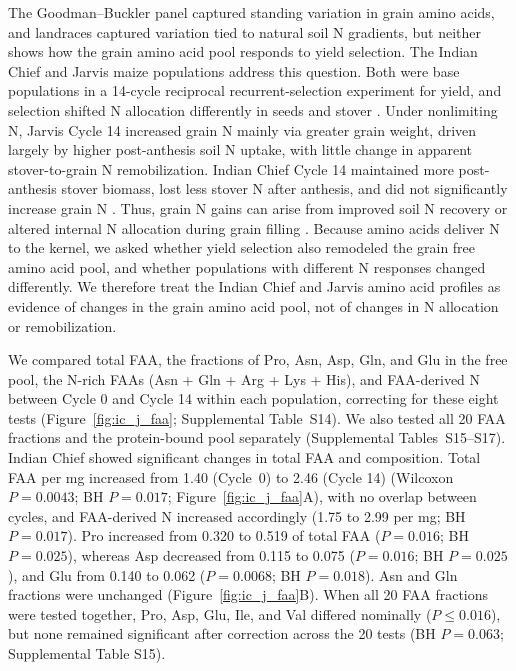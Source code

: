 \documentclass[namedate,unnumsec,webpdf,contemporary,large]{oup-authoring-template}
\begin{document}
The Goodman--Buckler panel captured standing variation in grain amino acids, and landraces captured variation tied to natural soil N gradients, but neither shows how the grain amino acid pool responds to yield selection. The Indian Chief and Jarvis maize populations address this question. Both were base populations in a 14-cycle reciprocal recurrent-selection experiment for yield, and selection shifted N allocation differently in seeds and stover \citep{Moll1994}. Under nonlimiting N, Jarvis Cycle 14 increased grain N mainly via greater grain weight, driven largely by higher post-anthesis soil N uptake, with little change in apparent stover-to-grain N remobilization. Indian Chief Cycle 14 maintained more post-anthesis stover biomass, lost less stover N after anthesis, and did not significantly increase grain N \citep{Moll1994}. Thus, grain N gains can arise from improved soil N recovery or altered internal N allocation during grain filling \citep{Mueller2019NUE}. Because amino acids deliver N to the kernel, we asked whether yield selection also remodeled the grain free amino acid pool, and whether populations with different N responses changed differently. We therefore treat the Indian Chief and Jarvis amino acid profiles as evidence of changes in the grain amino acid pool, not of changes in N allocation or remobilization.

We compared total FAA, the fractions of Pro, Asn, Asp, Gln, and Glu in the free pool, the N-rich FAAs (Asn + Gln + Arg + Lys + His), and FAA-derived N between Cycle 0 and Cycle 14 within each population, correcting for these eight tests (Figure~\ref{fig:ic_j_faa}; Supplemental Table~S14). We also tested all 20 FAA fractions and the protein-bound pool separately (Supplemental Tables~S15--S17). Indian Chief showed significant changes in total FAA and composition. Total FAA per mg increased from 1.40 (Cycle~0) to 2.46 (Cycle 14) (Wilcoxon $P = 0.0043$; BH $P = 0.017$; Figure~\ref{fig:ic_j_faa}A), with no overlap between cycles, and FAA-derived N increased accordingly (1.75 to 2.99 per mg; BH $P = 0.017$). Pro increased from 0.320 to 0.519 of total FAA ($P = 0.016$; BH $P = 0.025$), whereas Asp decreased from 0.115 to 0.075 ($P = 0.016$; BH $P = 0.025$), and Glu from 0.140 to 0.062 ($P = 0.0068$; BH $P = 0.018$). Asn and Gln fractions were unchanged (Figure~\ref{fig:ic_j_faa}B). When all 20 FAA fractions were tested together, Pro, Asp, Glu, Ile, and Val differed nominally ($P \le 0.016$), but none remained significant after correction across the 20 tests (BH $P = 0.063$; Supplemental Table S15).
\end{document}
